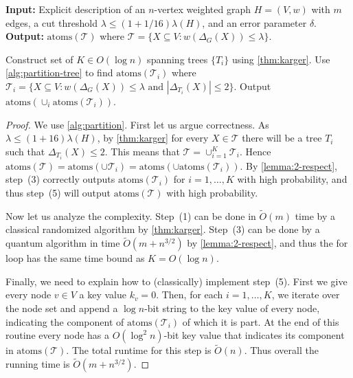 \documentclass[10pt,a4paper]{article}
\newcommand{\Tcal}{\mathcal{T}}
\newcommand{\atoms}{\mathrm{atoms}}
\newcommand{\tO}{\tilde O}
\newcommand{\1}{\mathbf{1}}
\theoremstyle{definition}
\begin{document}
\begin{algorithm}[H]
\caption{LearnCutAtoms$(H,\lambda,\delta)$}
\label{alg:partition}
 \hspace*{\algorithmicindent} \textbf{Input:} Explicit description of an $n$-vertex weighted graph $H = (V,w)$ with $m$ edges, a cut threshold $\lambda \le (1+1/16) \lambda(H)$, and an error parameter $\delta$. \\
 \hspace*{\algorithmicindent} \textbf{Output:} $\atoms(\Tcal)$ where $\Tcal = \{X \subseteq V: w(\Delta_G(X)) \le \lambda\}$.
\begin{algorithmic}[1]
\State
Construct set of $K \in O(\log n)$ spanning trees $\{T_i\}$ using \cref{thm:karger}.
\State
Use \cref{alg:partition-tree} to find $\atoms(\Tcal_i)$ where $\Tcal_i = \{X \subseteq V: w(\Delta_G(X)) \le \lambda \mbox{ and } |\Delta_{T_i}(X)| \le 2\}$.
\EndFor
\State
Output $\atoms(\cup_i \atoms(\Tcal_i))$.
\end{algorithmic}
\end{algorithm}

\cutatomsthm*

\begin{proof}
We use \cref{alg:partition}.  First let us argue correctness.  As $\lambda \le (1+16)\lambda(H)$, by \cref{thm:karger} for every $X \in \Tcal$ 
there will be a tree $T_i$ such that $\Delta_{T_i}(X) \le 2$.  This means that $\Tcal = \cup_{i=1}^K \Tcal_i$.  Hence 
$\atoms(\Tcal) = \atoms(\cup \Tcal_i) = \atoms(\cup \atoms(\Tcal_i))$.  By \cref{lemma:2-respect}, step~(3) correctly outputs $\atoms(\Tcal_i)$ 
for $i = 1, \ldots, K$ with high probability, and thus step~(5) will output $\atoms(\Tcal)$ with high probability.

Now let us analyze the complexity.  Step~(1) can be done in $\tO(m)$ time by a classical randomized algorithm by \cref{thm:karger}.  Step~(3) can 
be done by a quantum algorithm in time $\tO(m + n^{3/2})$ by \cref{lemma:2-respect}, and thus the for loop has the same time bound as $K = O(\log n)$.

Finally, we need to explain how to (classically) implement step~(5).  First we give every node $v \in V$ a key value $k_v = 0$.
Then, for each $i=1,\ldots, K$, we iterate over the node set and append a $\log n$-bit string to the key value of every node, indicating the component of $\atoms(\Tcal_i)$ of which it is part.
At the end of this routine every node has a $O(\log^2 n)$-bit key value that indicates its component in $\atoms(\Tcal)$.  The total runtime for this step is $\tO(n)$.  Thus overall 
the running time is $\tO(m + n^{3/2})$.
\end{proof}
\end{document}
